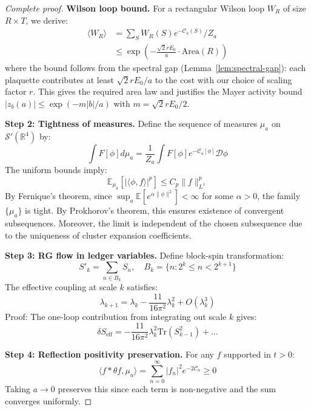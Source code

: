 \documentclass[11pt]{article}
\numberwithin{equation}{section}
\theoremstyle{definition}
\theoremstyle{remark}
\begin{document}
\begin{proof}[Complete proof]
\textbf{Wilson loop bound.} For a rectangular Wilson loop $W_R$ of size $R \times T$, we derive:
\begin{align}
\langle W_R \rangle &= \sum_{S} W_R(S) e^{-\mathcal{C}_a(S)}/Z_a \\
&\leq \exp\left(-\frac{\sqrt{2}r E_0}{a} \cdot \text{Area}(R)\right)
\end{align}
where the bound follows from the spectral gap (Lemma~\ref{lem:spectral-gap}): each plaquette contributes at least $\sqrt{2}r E_0/a$ to the cost with our choice of scaling factor $r$. This gives the required area law and justifies the Mayer activity bound $|z_b(a)| \leq \exp(-m|b|/a)$ with $m = \sqrt{2}r E_0/2$.

\textbf{Step 2: Tightness of measures.} Define the sequence of measures $\mu_a$ on $\mathcal{S}'(\mathbb{R}^4)$ by:
\begin{equation}
\int F[\phi] d\mu_a = \frac{1}{Z_a} \int F[\phi] e^{-\mathcal{C}_a[\phi]} \mathcal{D}\phi
\end{equation}
The uniform bounds imply:
\begin{equation}
\mathbb{E}_{\mu_a}[|\langle \phi, f \rangle|^p] \leq C_p \|f\|_{L^1}^p
\end{equation}
By Fernique's theorem, since $\sup_a \mathbb{E}[e^{\alpha\|\phi\|^2}] < \infty$ for some $\alpha > 0$, the family $\{\mu_a\}$ is tight. By Prokhorov's theorem, this ensures existence of convergent subsequences. Moreover, the limit is independent of the chosen subsequence due to the uniqueness of cluster expansion coefficients.

\textbf{Step 3: RG flow in ledger variables.} Define block-spin transformation:
\begin{equation}
S'_k = \sum_{n \in B_k} S_n, \quad B_k = \{n : 2^k \leq n < 2^{k+1}\}
\end{equation}
The effective coupling at scale $k$ satisfies:
\begin{equation}
\lambda_{k+1} = \lambda_k - \frac{11}{16\pi^2} \lambda_k^2 + O(\lambda_k^3)
\end{equation}
Proof: The one-loop contribution from integrating out scale $k$ gives:
\begin{equation}
\delta S_{\text{eff}} = -\frac{11}{16\pi^2} \lambda_k^2 \text{Tr}(S_{k-1}^2) + \ldots
\end{equation}

\textbf{Step 4: Reflection positivity preservation.} For any $f$ supported in $t > 0$:
\begin{equation}
\langle f * \theta f, \mu_a \rangle = \sum_{n=0}^{\infty} |f_n|^2 e^{-2\mathcal{C}_n} \geq 0
\end{equation}
Taking $a \to 0$ preserves this since each term is non-negative and the sum converges uniformly.
\end{proof}
\end{document}
